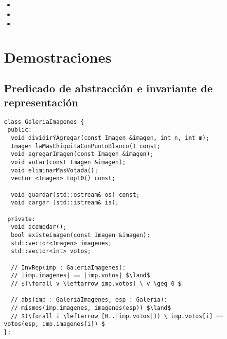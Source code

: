\documentclass[10pt,a4paper,spanish]{article}
\begin{document}
\begin{itemize}
	\item {}

	\item {}

	\item \auxil{listaVotosOrdenados(g: Galeria, imgs: [Imagen]) : [\ent]}{ \newline
	  [votos(g,im) \ | \ i \leftarrow [0..|imgs|),im \leftarrow imgs, cuentaMasVotos(g,imgs,im)==i]
	}

\end{itemize}

\section{Demostraciones}

\subsection{Predicado de abstracción e invariante de representación}

\begin{lstlisting}
class GaleriaImagenes {
 public:
  void dividirYAgregar(const Imagen &imagen, int n, int m);
  Imagen laMasChiquitaConPuntoBlanco() const;
  void agregarImagen(const Imagen &imagen);
  void votar(const Imagen &imagen);
  void eliminarMasVotada();
  vector <Imagen> top10() const;

  void guardar(std::ostream& os) const;
  void cargar (std::istream& is);

 private:
  void acomodar();
  bool existeImagen(const Imagen &imagen);
  std::vector<Imagen> imagenes;
  std::vector<int> votos;

  // InvRep(imp : GaleriaImagenes):
  // |imp.imagenes| == |imp.votos| $\land$
  // $(\forall v \leftarrow imp.votos) \ v \geq 0 $

  // abs(imp : GaleriaImagenes, esp : Galeria):
  // mismos(imp.imagenes, imagenes(esp)) $\land$
  // $(\forall i \leftarrow [0..|imp.votos|)) \ imp.votos[i] == votos(esp, imp.imagenes[i]) $
};
\end{lstlisting}
\end{document}
